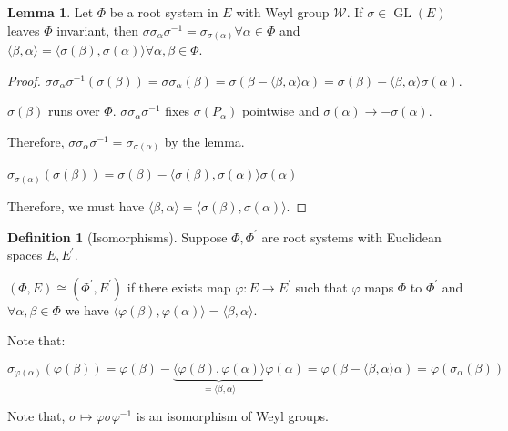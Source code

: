 \documentclass{article}
\theoremstyle{definition}
\newtheorem*{definition}{Definition}
\newtheorem{lemma}[theorem]{Lemma}
\begin{document}
\begin{lemma}
    Let \(\Phi\) be a root system in \(E\) with Weyl group \(\mathcal{W}\). If \(\sigma \in \operatorname{GL}(E)\) leaves \(\Phi\) invariant, then \(\sigma \sigma_\alpha \sigma ^{-1} = \sigma_{\sigma (\alpha)} \forall \alpha \in \Phi\) and \(\langle \beta ,\alpha  \rangle = \langle \sigma(\beta), \sigma(\alpha) \rangle \forall \alpha ,\beta \in \Phi \).
\end{lemma}

\begin{proof}
    \(\sigma \sigma_\alpha \sigma ^{-1} (\sigma (\beta )) = \sigma \sigma_\alpha (\beta) = \sigma(\beta - \langle \beta ,\alpha  \rangle \alpha ) = \sigma(\beta) - \langle \beta ,\alpha  \rangle \sigma(\alpha)\).

    \(\sigma(\beta)\) runs over \(\Phi\). \(\sigma \sigma_\alpha \sigma ^{-1}\) fixes \(\sigma(P_\alpha)\) pointwise and \(\sigma(\alpha) \to -\sigma(\alpha)\). 

    Therefore, \(\sigma \sigma_\alpha \sigma ^{-1} = \sigma_{\sigma(\alpha)}\) by the lemma.

    \(\sigma_{\sigma(\alpha)}(\sigma(\beta)) = \sigma(\beta) - \langle \sigma(\beta), \sigma(\alpha) \rangle \sigma(\alpha)\) 

    Therefore, we must have \(\langle \beta , \alpha \rangle = \langle \sigma(\beta) , \sigma(\alpha ) \rangle \). 
\end{proof}

\begin{definition}
    [Isomorphisms] Suppose \(\Phi, \Phi ^{\prime} \) are root systems with Euclidean spaces \(E, E^{\prime}\).

    \((\Phi , E) \cong (\Phi ^{\prime} , E^{\prime} )\) if there exists map \(\varphi: E \to E^{\prime}\) such that \(\varphi\) maps \(\Phi\) to \(\Phi ^{\prime} \) and \(\forall \alpha ,\beta \in \Phi\) we have \(\langle \varphi(\beta), \varphi(\alpha) \rangle = \langle \beta , \alpha \rangle \).
\end{definition}

Note that:

\[
    \sigma_{\varphi(\alpha)}(\varphi(\beta)) = \varphi(\beta) - \underbrace{\langle \varphi (\beta), \varphi(\alpha) \rangle }_{=\langle \beta ,\alpha  \rangle} \varphi (\alpha) = \varphi (\beta - \langle \beta ,\alpha  \rangle \alpha) = \varphi (\sigma_\alpha (\beta))
\]

Note that, \(\sigma \mapsto \varphi \sigma \varphi ^{-1} \) is an isomorphism of Weyl groups.
\end{document}

